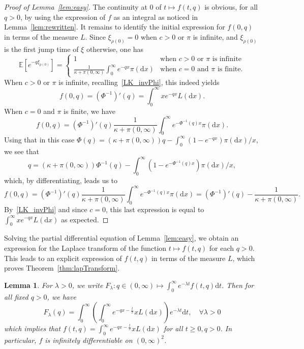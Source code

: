 \documentclass[10pt]{amsart}
\newtheorem{lemm}[theo]{Lemma}
\theoremstyle{definition}
\numberwithin{equation}{section}
\newcommand{\bbE}{\mathbb{E}}
\newcommand{\dd}{\mathrm{d}}
\let\oldforall\forall
\renewcommand*{\forall}{\mathrel{\oldforall}}
\begin{document}
\begin{proof}[Proof of Lemma~\ref{lem:easy}]
The continuity at 0 of $t \mapsto f(t,q)$ is obvious, for all $q>0$, by using the expression of $f$ as an integral as noticed in Lemma~\ref{lem:rewritten}. It remains to identify the initial expression for $f(0,q)$ in terms of the measure $L$. Since $\xi_{\rho(0)}=0$ when $c>0$ or $\pi$ is infinite, and $\xi_{\rho(0)}$ is the first jump time of $\xi$ otherwise, one has
\[
\bbE\left[e^{-q \xi_{\rho(0)}}\right]=\left\{
\begin{array}{ll} 1 & \text{when $c>0$ or $\pi$ is infinite}\\ \frac{1}{\kappa+\pi(0,\infty)}\int_0^{\infty}e^{-qx} \pi(\dd x) & \text{when $c=0$ and $\pi$ is finite.}
\end{array}\right.
\]
When $c>0$ or $\pi$ is infinite, recalling~\eqref{LK_invPhi}, this indeed yields
\[
f(0,q)=(\Phi^{-1})'(q)=\int_0^{\infty} xe^{-qx} L(\dd x).
\]
When $c=0$ and $\pi$ is finite, we have
\[
f(0,q)=(\Phi^{-1})'(q) \frac{1}{\kappa+\pi(0,\infty)}\int_0^{\infty}e^{-\Phi^{-1}(q)x} \pi(\dd x).
\]
Using that in this case $\Phi(q)=(\kappa+\pi(0,\infty))q-\int_0^{\infty}(1-e^{-qx})\pi(\dd x)/x$, we see that
\[
q=(\kappa+\pi(0,\infty))\Phi^{-1}(q)-\int_0^{\infty}\left(1-e^{-\Phi^{-1}(q)x}\right)\pi(\dd x)/x,
\]
which, by differentiating, leads us to
\[
f(0,q)=(\Phi^{-1})'(q) \frac{1}{\kappa+\pi(0,\infty)}\int_0^{\infty}e^{-\Phi^{-1}(q)x} \pi(\dd x)=(\Phi^{-1})'(q) -\frac{1}{\kappa+\pi(0,\infty)}.
\]
By~\eqref{LK_invPhi} and since $c=0$, this last expression is equal to $\int_0^{\infty} xe^{-qx} L(\dd x)$ as expected.
\end{proof}

Solving the partial differential equation of Lemma~\ref{lem:easy}, we obtain an expression for the Laplace transform of the function $t \mapsto f(t,q)$ for each $q > 0$. This leads to an explicit expression of $f(t,q)$ in terms of the measure $L$, which proves Theorem~\ref{thm:lapTransform}.

\begin{lemm}\label{lem:laplaceLaplace}
For $\lambda>0$, we write $F_{\lambda} : q \in (0,\infty)\mapsto \int_0^{\infty} e^{-\lambda t} f(t,q) \dd t$. Then for all fixed $q>0$, we have
\begin{equation}\label{eq:Laplace}
F_{\lambda}(q)=\int_0^{\infty} \left(\int_0^{\infty} e^{-qx -\frac{t}{x}} xL(\dd x)\right) e^{-\lambda t} \dd t, \quad \forall \lambda>0
\end{equation}
which implies that $f(t,q)= \int_0^{\infty} e^{-qx -\frac{t}{x}} xL(\dd x)$ for all $t \geq 0, q>0$. In particular, $f$ is infinitely differentiable on $(0,\infty)^2$.
\end{lemm}
\end{document}
